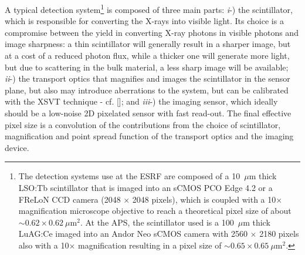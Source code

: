 \begin{refsection}
A typical detection system\footnote{The detection systems use at the ESRF are composed of a 10~$\mu$m thick LSO:Tb scintillator that is imaged into an sCMOS PCO Edge 4.2 or a FReLoN CCD camera (2048 $\times$ 2048 pixels), which is coupled with a 10$\times$ magnification microscope objective to reach a theoretical pixel size of about $\sim0.62\times0.62~\mu$m$^2$. At the APS, the scintillator used is a 100~$\mu$m thick LuAG:Ce imaged into an Andor Neo sCMOS camera with 2560 $\times$ 2180 pixels also with a 10$\times$ magnification resulting in a pixel size of $\sim0.65\times0.65~\mu$m$^2$.} is composed of three main parts: \textit{i}-) the scintillator, which is responsible for converting the X-rays into visible light. Its choice is a compromise between the yield in converting X-ray photons in visible photons and image sharpness: a thin scintillator will generally result in a sharper image, but at a cost of a reduced photon flux, while a thicker one will generate more light, but due to scattering in the bulk material, a less sharp image will be available; \textit{ii}-) the transport optics that magnifies and images the scintillator in the sensor plane, but also may introduce aberrations to the system, but can be calibrated with the XSVT technique - cf. [\cite[\textit{\S2.2}]{Berujon2020a}]; and \textit{iii}-) the imaging sensor, which ideally should be a low-noise 2D pixelated sensor with fast read-out. The final effective pixel size is a convolution of the contributions from the choice of scintillator, magnification and point spread function of the transport optics and the imaging device.


\end{refsection}
